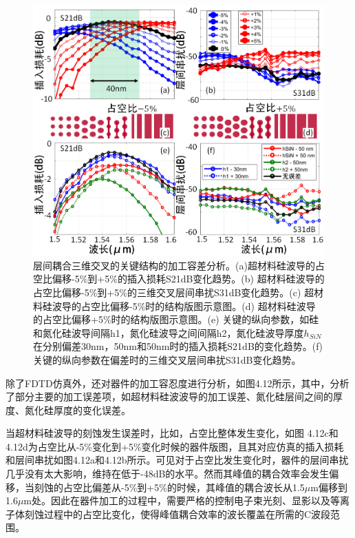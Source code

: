 \begin{figure}[!htbp]
    \centering
    \includegraphics[width=1\textwidth]{Img/4-12.png}
    \caption{层间耦合三维交叉的关键结构的加工容差分析。(a)超材料硅波导的占空比偏移-5\%到+5\%的插入损耗S21dB变化趋势。(b) 超材料硅波导的占空比偏移-5\%到+5\%的三维交叉层间串扰S31dB变化趋势。(c) 超材料硅波导的占空比偏移-5\%时的结构版图示意图。(d) 超材料硅波导的占空比偏移+5\%时的结构版图示意图。(e) 关键的纵向参数，如硅和氮化硅波导间隔h1，氮化硅波导之间间隔h2，氮化硅波导厚度$h_{SiN}$在分别偏差30nm，50nm和50nm时的插入损耗S21dB的变化趋势。(f) 关键的纵向参数在偏差时的三维交叉层间串扰S31dB变化趋势。}
    \label{fig:4-12}
\end{figure}

除了FDTD仿真外，还对器件的加工容忍度进行分析，如图4.12所示，其中，分析了部分主要的加工误差项，如超材料硅波波导的加工误差、氮化硅层间之间的厚度、氮化硅厚度的变化误差。

当超材料硅波导的刻蚀发生误差时，比如，占空比整体发生变化，如图 4.12c和4.12d为占空比从-5\%变化到+5\%变化时候的器件版图，且其对应仿真的插入损耗和层间串扰如图4.12a和4.12b所示。可见对于占空比发生变化时，器件的层间串扰几乎没有太大影响，维持在低于-48dB的水平。然而其峰值的耦合效率会发生偏移，当刻蚀的占空比偏差从-5\%到+5\%的时候，其峰值的耦合波长从1.5$\mu$m偏移到1.6$\mu$m处。因此在器件加工的过程中，需要严格的控制电子束光刻、显影以及等离子体刻蚀过程中的占空比变化，使得峰值耦合效率的波长覆盖在所需的C波段范围。\cite{Alexander}

